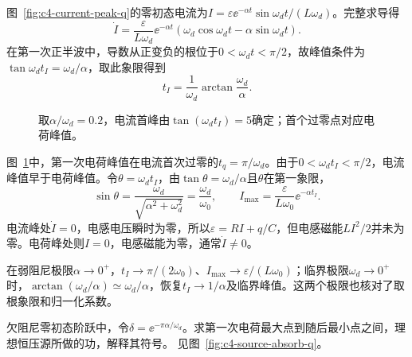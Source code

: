 \begin{solution}
图~\ref{fig:c4-current-peak-q}的零初态电流为$I=\varepsilon\ee^{-\alpha t}\sin\omega_dt/(L\omega_d)$。完整求导得
\[
 \dot I=\frac\varepsilon{L\omega_d}\ee^{-\alpha t}
 (\omega_d\cos\omega_dt-\alpha\sin\omega_dt).
\]
在第一次正半波中，导数从正变负的根位于$0<\omega_dt<\pi/2$，故峰值条件为$\tan\omega_dt_I=\omega_d/\alpha$，取此象限得到
\[
 \boxed{t_I=\frac1{\omega_d}\arctan\frac{\omega_d}{\alpha}}.
\]
\begin{figure}[H]\centering
{}
\caption{取$\alpha/\omega_d=0.2$，电流首峰由$\tan(\omega_dt_I)=5$确定；首个过零点对应电荷峰值。}\label{fig:c4-current-peak-s}
\end{figure}
图~\ref{fig:c4-current-peak-s}中，第一次电荷峰值在电流首次过零的$t_q=\pi/\omega_d$。由于$0<\omega_dt_I<\pi/2$，电流峰值早于电荷峰值。令$\theta=\omega_dt_I$，由$\tan\theta=\omega_d/\alpha$且$\theta$在第一象限，
\[
 \sin\theta=\frac{\omega_d}{\sqrt{\alpha^2+\omega_d^2}}
 =\frac{\omega_d}{\omega_0},\qquad
 \boxed{I_{\max}=\frac\varepsilon{L\omega_0}\ee^{-\alpha t_I}}.
\]
电流峰处$\dot I=0$，电感电压瞬时为零，所以$\varepsilon=RI+q/C$，但电感磁能$LI^2/2$并未为零。电荷峰处则$I=0$，电感磁能为零，通常$\dot I\ne0$。

在弱阻尼极限$\alpha\to0^+$，$t_I\to\pi/(2\omega_0)$、$I_{\max}\to\varepsilon/(L\omega_0)$；临界极限$\omega_d\to0^+$时，$\arctan(\omega_d/\alpha)\simeq\omega_d/\alpha$，恢复$t_I\to1/\alpha$及临界峰值。这两个极限也核对了取根象限和归一化系数。
\end{solution}

\begin{example}[电容过冲后的电源能量回收]\label{ex:c4-source-absorb}
欠阻尼零初态阶跃中，令$\delta=\ee^{-\pi\alpha/\omega_d}$。求第一次电荷最大点到随后最小点之间，理想恒压源所做的功，解释其符号。 见图~\ref{fig:c4-source-absorb-q}。
\end{example}

